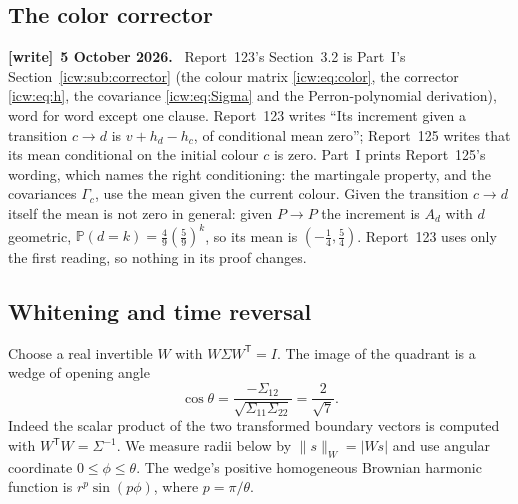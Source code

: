 \documentclass[11pt,letterpaper]{article}
\theoremstyle{remark}\newtheorem{remark}[theorem]{Remark}
\newcommand{\Prob}{\mathbb P}
\newcommand{\1}{\mathbf1}
\newenvironment{writenote}[1][]{\par\smallskip\begingroup\small
 \noindent\textbf{[write]}\if\relax\detokenize{#1}\relax\else~\textbf{#1.}\fi\ }%
 {\par\endgroup\smallskip}
\begin{document}
\subsection{The color corrector}\label{icw:log:sub:corrector}
\begin{writenote}[5 October 2026]
Report~123's Section~3.2 is Part~I's Section~\ref{icw:sub:corrector} (the colour matrix \eqref{icw:eq:color}, the corrector \eqref{icw:eq:h}, the covariance \eqref{icw:eq:Sigma} and the Perron-polynomial derivation), word for word except one clause. Report~123 writes ``Its increment given a transition $c\to d$ is $v+h_d-h_c$, of conditional mean zero''; Report~125 writes that its mean conditional on the initial colour $c$ is zero. Part~I prints Report~125's wording, which names the right conditioning: the martingale property, and the covariances $\Gamma_c$, use the mean given the current colour. Given the transition $c\to d$ itself the mean is not zero in general: given $P\to P$ the increment is $A_d$ with $d$ geometric, $\Prob(d=k)=\frac49(\frac59)^k$, so its mean is $(-\frac14,\frac54)$. Report~123 uses only the first reading, so nothing in its proof changes.
\end{writenote}

\subsection{Whitening and time reversal}\label{icw:log:sub:whitening}
Choose a real invertible $W$ with $W\Sigma W^{\mathsf T}=I$.
The image of the quadrant is a wedge of opening angle
\begin{equation}\label{icw:log:eq:angle}
 \cos\theta=\frac{-\Sigma_{12}}{\sqrt{\Sigma_{11}\Sigma_{22}}}
            =\frac2{\sqrt7}.
\end{equation}
Indeed the scalar product of the two transformed boundary vectors is
computed with $W^{\mathsf T}W=\Sigma^{-1}$. We measure radii below by
$\|s\|_W=|Ws|$ and use angular coordinate $0\le\phi\le\theta$.
The wedge's positive homogeneous Brownian harmonic function is
$r^p\sin(p\phi)$, where $p=\pi/\theta$.
\end{document}
